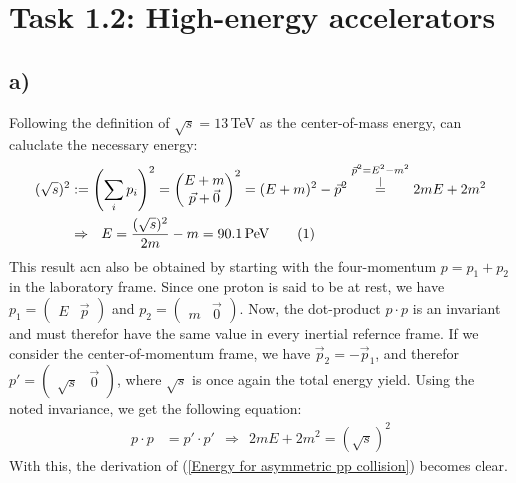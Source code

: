 \documentclass[a4paper,12pt]{article}
\newcommand\numberthis{\addtocounter{equation}{1}\tag{\theequation}}
\newcommand{\kom}{}
\newcommand{\kla}{}
\newcommand{\tecxt}{}
\begin{document}
\section*{Task 1.2: High-energy accelerators}
\subsection*{a)}Following the definition of $\sqrt{s}=13\,$TeV as the center-of-mass energy, can caluclate the necessary energy:
\begin{align*}
(\sqrt{s})^2&:=\kla\left( {\sum_ip_i} \right)^2=\begin{pmatrix}
E+m \\ \vec{p}+\vec{0}
\end{pmatrix}^2=(E+m)^2-\vec{p}^2\kom\overset{\substack{{\vec{p}^2=E^2-m^2} \\ |}}{=} 2mE+2m^2\\
&\Rightarrow\ \ E=\frac{(\sqrt{s})^2}{2m}-m=90.1\,\tecxt\text{PeV}\numberthis\label{Energy for asymmetric pp collision}
\end{align*}
This result acn also be obtained by starting with the four-momentum $p=p_1+p_2$ in the laboratory frame. Since one proton is said to be at rest, we have $p_1=\begin{pmatrix} E&\vec{p} \end{pmatrix} $ and $p_2=\begin{pmatrix} m&\vec{0} \end{pmatrix}$. Now, the dot-product $p\cdot p$ is an invariant and must therefor have the same value in every inertial refernce frame. If we consider the center-of-momentum frame, we have $\vec{p}_2=-\vec{p}_1$, and therefor $p'=\begin{pmatrix} \sqrt{s}&\vec{0} \end{pmatrix}$, where $\sqrt{s}$ is once again the total energy yield. Using the noted invariance, we get the following equation:
\begin{align*}
p\cdot p&=p'\cdot p'\ \ \Rightarrow\ \ 2mE+2m^2=(\sqrt{s})^2
\end{align*}
With this, the derivation of (\ref{Energy for asymmetric pp collision}) becomes clear.
\end{document}
